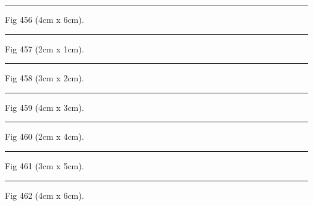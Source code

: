 \documentclass[a4paper,11pt]{article}
\begin{document}
\begin{swarmwrap}%
  \begin{minipage}[t]{4cm}
    \centering
    \rule{\linewidth}{6cm}
    {\footnotesize Fig 456 (4cm x 6cm).}
  \end{minipage}%
\end{swarmwrap}%
\swarmwrapnext
\lipsum[6]%

\begin{swarmwrap}%
  \begin{minipage}[t]{2cm}
    \centering
    \rule{\linewidth}{1cm}
    {\footnotesize Fig 457 (2cm x 1cm).}
  \end{minipage}%
\end{swarmwrap}%
\swarmwrapnext
\lipsum[7]%

\begin{swarmwrap}%
  \begin{minipage}[t]{3cm}
    \centering
    \rule{\linewidth}{2cm}
    {\footnotesize Fig 458 (3cm x 2cm).}
  \end{minipage}%
\end{swarmwrap}%
\swarmwrapnext
\lipsum[8]%

\begin{swarmwrap}%
  \begin{minipage}[t]{4cm}
    \centering
    \rule{\linewidth}{3cm}
    {\footnotesize Fig 459 (4cm x 3cm).}
  \end{minipage}%
\end{swarmwrap}%
\swarmwrapnext
\lipsum[9]%

\begin{swarmwrap}%
  \begin{minipage}[t]{2cm}
    \centering
    \rule{\linewidth}{4cm}
    {\footnotesize Fig 460 (2cm x 4cm).}
  \end{minipage}%
\end{swarmwrap}%
\swarmwrapnext
\lipsum[10]%

\begin{swarmwrap}%
  \begin{minipage}[t]{3cm}
    \centering
    \rule{\linewidth}{5cm}
    {\footnotesize Fig 461 (3cm x 5cm).}
  \end{minipage}%
\end{swarmwrap}%
\swarmwrapnext
\lipsum[11]%

\begin{swarmwrap}%
  \begin{minipage}[t]{4cm}
    \centering
    \rule{\linewidth}{6cm}
    {\footnotesize Fig 462 (4cm x 6cm).}
  \end{minipage}%
\end{swarmwrap}%
\swarmwrapnext
\lipsum[12]%
\end{document}
